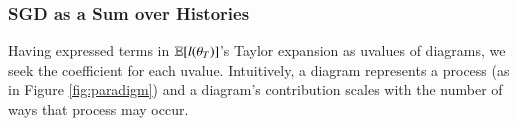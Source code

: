     \subsubsection{SGD as a Sum over Histories}\label{sect:histories}
            Having expressed terms in $\mathbb{E}[l(\theta_T)]$'s Taylor expansion %
            as uvalues of
            diagrams, we seek the coefficient for each uvalue.  Intuitively, a
            diagram represents a process (as in Figure \ref{fig:paradigm}) and
            a diagram's contribution scales with the number of ways that
            process may occur.
